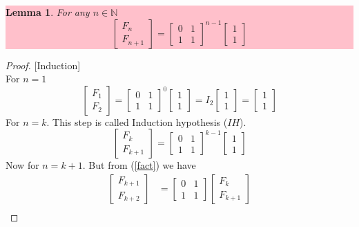 \documentclass[paper=a4, fontsize=11pt,twoside]{scrartcl}		%
\newtheorem{lem}[thm]{Lemma}
\theoremstyle{definition}
\theoremstyle{remark}
\begin{document}
\colorbox{pink}{\parbox{\textwidth}{\begin{lem}
For any $n\in\mathbb{N}$
$$
\left[\begin{matrix} F_n\\ F_{n+1} \end{matrix}\right] = \left[ \begin{matrix} 0   & 1 \\ 1  & 1 \end{matrix}\right]^{n-1} \left[\begin{matrix} 1\\ 1 \end{matrix}\right]
$$
\end{lem}}}
\begin{proof}{[Induction]}\\
For $n=1$
$$
\left[\begin{matrix} F_1\\ F_2 \end{matrix} \right] = \left[ \begin{matrix} 0   & 1 \\ 1  & 1 \end{matrix}\right]^0 \left[\begin{matrix} 1\\ 1\end{matrix}\right]=I_2\left[\begin{matrix} 1\\ 1\end{matrix}\right]=\left[\begin{matrix} 1\\ 1\end{matrix}\right]
$$
For $n=k$. This step is called Induction hypothesis ($IH$)\label{lem1}.
$$
\left[\begin{matrix} F_k\\ F_{k+1} \end{matrix} \right] = \left[ \begin{matrix} 0   & 1 \\ 1  & 1 \end{matrix}\right]^{k-1} \left[\begin{matrix} 1\\ 1\end{matrix}\right]
$$
Now for $n=k+1$. But from (\ref{fact}) we have
\begin{align*}
\left[\begin{matrix} F_{k+1}\\ F_{k+2} \end{matrix}\right] &= \left[ \begin{matrix} 0   & 1 \\ 1  & 1 \end{matrix}\right] \left[\begin{matrix} F_{k}\\ F_{k+1} \end{matrix}\right]\\

\end{align*}
\end{proof}
\end{document}
